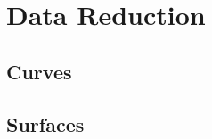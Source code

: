 \chapter{Data Reduction}
\label{datareduction}
\section{Curves}

\pgsbreak

\pgsbreak

\pgsbreak

\pgsbreak
\section{Surfaces}

\pgsbreak

\pgsbreak

\pgsbreak

